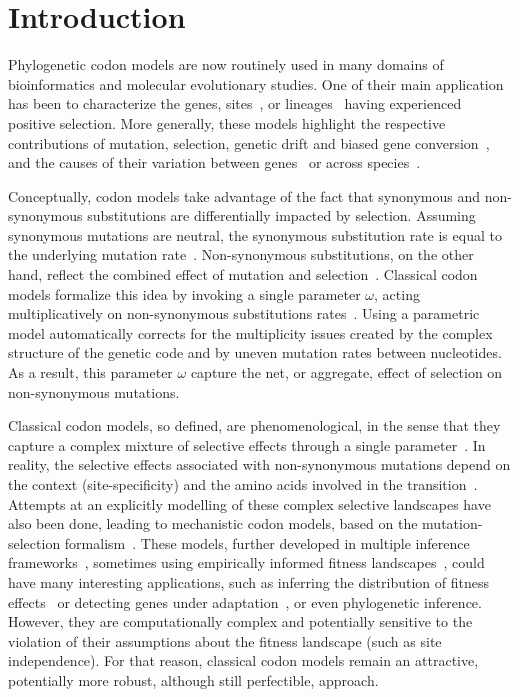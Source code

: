 \section{Introduction}

Phylogenetic \gls{codon} models are now routinely used in many domains of bioinformatics and molecular evolutionary studies.
One of their main application has been to characterize the genes, sites~\citep{Nielsen1998}, or lineages~\citep{Zhang2004} having experienced positive selection.
More generally, these models highlight the respective contributions of mutation, selection, \gls{genetic drift} and biased gene conversion~\citep{Kosiol2019}, and the causes of their variation between genes~\citep{Zhang2015} or across species~\citep{Lartillot2011}.

Conceptually, \gls{codon} models take advantage of the fact that \gls{synonymous} and \gls{non-synonymous} \glspl{substitution} are differentially impacted by selection.
Assuming \gls{synonymous} mutations are \gls{neutral}, the \gls{synonymous} \gls{substitution} rate is equal to the underlying mutation rate~\citep{kimura1983neutral}.
Non-synonymous \glspl{substitution}, on the other hand, reflect the combined effect of mutation and selection~\citep{Ohta1995}.
Classical \gls{codon} models formalize this idea by invoking a single parameter $\omega$, acting multiplicatively on \gls{non-synonymous} \glspl{substitution} rates~\citep{Muse1994, Goldman1994}.
Using a parametric model automatically corrects for the multiplicity issues created by the complex structure of the genetic code and by uneven mutation rates between nucleotides.
As a result, this parameter $\omega$ capture the net, or aggregate, effect of selection on \gls{non-synonymous} mutations.

Classical \gls{codon} models, so defined, are phenomenological, in the sense that they capture a complex mixture of selective effects through a single parameter~\citep{Rodrigue2010a}.
In reality, the selective effects associated with \gls{non-synonymous} mutations depend on the context (site-specificity) and the amino acids involved in the transition~\citep{Kosiol2007}.
Attempts at an explicitly modelling of these complex selective landscapes have also been done, leading to mechanistic \gls{codon} models, based on the mutation-selection formalism~\citep{Halpern1998}.
These models, further developed in multiple inference frameworks~\citep{Rodrigue2010, Tamuri2012}, sometimes using empirically informed fitness landscapes~\citep{Bloom2014}, could have many interesting applications, such as inferring the distribution of fitness effects~\citep{Tamuri2012} or detecting genes under adaptation~\citep{Rodrigue2016}, or even phylogenetic inference.
However, they are computationally complex and potentially sensitive to the violation of their assumptions about the fitness landscape (such as site independence).
For that reason, classical \gls{codon} models remain an attractive, potentially more robust, although still perfectible, approach.

